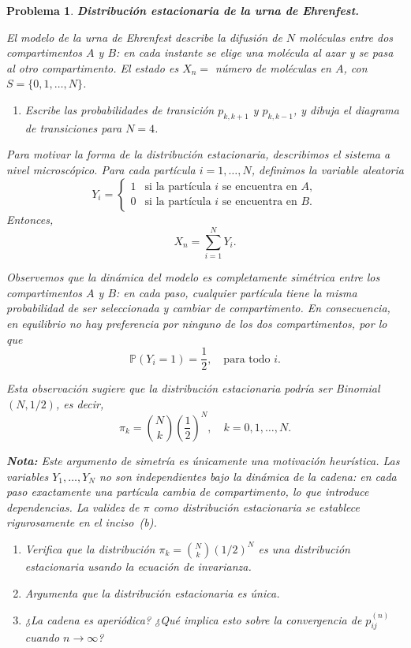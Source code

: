\documentclass[12pt]{article}
\newtheorem{problem}{Problema}
\begin{document}
\begin{problem}
\textbf{Distribución estacionaria de la urna de Ehrenfest.}

El modelo de la urna de Ehrenfest describe la difusión de $N$ moléculas entre dos compartimentos $A$ y $B$: en cada instante se elige una molécula al azar y se pasa al otro compartimento. El estado es $X_n =$ número de moléculas en $A$, con $S = \{0, 1, \ldots, N\}$.

\begin{enumerate}
    \item[(a)] Escribe las probabilidades de transición $p_{k,k+1}$ y $p_{k,k-1}$, y dibuja el diagrama de transiciones para $N = 4$.
\end{enumerate}

Para motivar la forma de la distribución estacionaria, describimos el sistema a nivel microscópico. Para cada partícula $i = 1, \dots, N$, definimos la variable aleatoria
\[
Y_i =
\begin{cases}
1 & \text{si la partícula $i$ se encuentra en $A$}, \\
0 & \text{si la partícula $i$ se encuentra en $B$}.
\end{cases}
\]
Entonces,
\[
X_n = \sum_{i=1}^N Y_i.
\]

Observemos que la dinámica del modelo es completamente simétrica entre los compartimentos $A$ y $B$: en cada paso, cualquier partícula tiene la misma probabilidad de ser seleccionada y cambiar de compartimento. En consecuencia, en equilibrio no hay preferencia por ninguno de los dos compartimentos, por lo que
\[
\mathbb{P}(Y_i = 1) = \frac{1}{2}, \quad \text{para todo } i.
\]

Esta observación sugiere que la distribución estacionaria podría ser Binomial$(N, 1/2)$, es decir,
\[
\pi_k = \binom{N}{k}\left(\frac{1}{2}\right)^N, \quad k = 0,1,\dots,N.
\]

\noindent\textbf{Nota:} Este argumento de simetría es únicamente una motivación heurística. Las variables $Y_1, \dots, Y_N$ \emph{no} son independientes bajo la dinámica de la cadena: en cada paso exactamente una partícula cambia de compartimento, lo que introduce dependencias. La validez de $\pi$ como distribución estacionaria se establece rigurosamente en el inciso~(b).

\begin{enumerate}
    \item[(b)] Verifica que la distribución $\pi_k = \binom{N}{k}(1/2)^N$ es una distribución estacionaria usando la ecuación de invarianza.

    \item[(c)] Argumenta que la distribución estacionaria es única.

    \item[(d)] ¿La cadena es aperiódica? ¿Qué implica esto sobre la convergencia de $p_{ij}^{(n)}$ cuando $n \to \infty$?
\end{enumerate}
\end{problem}
\end{document}
